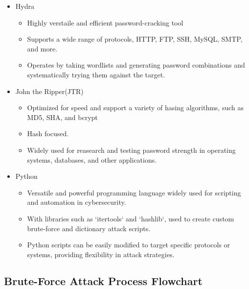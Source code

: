 \documentclass{comjnl}
\begin{document}
\begin{itemize}
  \item Hydra
  \begin{itemize}
    \item Highly verstaile and efficient password-cracking tool
    \item Supports a wide range of protocols, HTTP, FTP, SSH, MySQL, SMTP, and more.
    \item Operates by taking wordlists and generating password combinations and systematically trying them against the target.
  \end{itemize}  
  \item John the Ripper(JTR)
  \begin{itemize}
    \item Optimized for speed and support a variety of hasing algorithms, such as MD5, SHA, and bcrypt
    \item Hash focused.
    \item Widely used for reasearch and testing password strength in operating systems, databases, and other applications.
  \end{itemize}
  \item Python
  \begin{itemize}
      \item Versatile and powerful programming language widely used for scripting and automation in cybersecurity.
      \item With libraries such as `itertools` and `hashlib`, used to create custom brute-force and dictionary attack scripts.
      \item Python scripts can be easily modified to target specific protocols or systems, providing flexibility in attack strategies.
  \end{itemize}
\end{itemize}

\subsection{Brute-Force Attack Process Flowchart}

\end{document}
